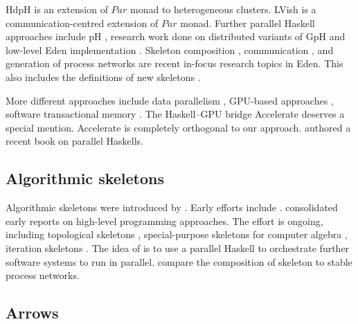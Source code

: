\documentclass{jfp1}
\newcommand{\Conid}[1]{\mathit{#1}}
\renewcommand{\cite}[1]{\citep{#1}}
\begin{document}
HdpH \cite{Maier:2014:HDS:2775050.2633363,stewart_maier_trinder_2016} is an extension of \ensuremath{\Conid{Par}} monad to heterogeneous clusters. LVish \cite{Kuper:2014:TPE:2666356.2594312} is a communication-centred extension of \ensuremath{\Conid{Par}} monad.
%
Further parallel Haskell approaches include pH \cite{ph-book}, research work done on distributed variants of GpH \cite{Trinder1996,Aljabri:2013:DIG:2620678.2620682,Aljabri2015} and low-level Eden implementation \cite{JostThesis,berthold_loidl_hammond_2016}. Skeleton composition \cite{dieterle_horstmeyer_loogen_berthold_2016}, communication \cite{Dieterle2010}, and generation of process networks \cite{Horstmeyer2013} are recent in-focus research topics in Eden. This also includes the definitions of new skeletons \cite{doi:10.1142/S0129626403001380,Eden:PARCO05,Berthold2009-mr,Berthold2009-fft,dieterle2010skeleton,delaEncina2011,Dieterle2013,janjic2013space}.

More different approaches include data parallelism \cite{Chakravarty2007,Keller:2010:RSP:1932681.1863582,}, GPU-based approaches \cite{Mainland:2010:NEC:2088456.1863533,obsidian-phd}, software transactional memory \cite{Harris:2005:CMT:1065944.1065952,Perfumo:2008:LST:1366230.1366241}.
%
The Haskell--GPU bridge Accelerate \cite{Chakravarty:2011:AHA:1926354.1926358,CMCK14,McDonell:2015:TRC:2887747.2804313} deserves a special mention. Accelerate is completely orthogonal to our approach. \citeauthor{marlow2013parallel} authored a recent book \citeyear{marlow2013parallel} on parallel Haskells.

\subsection{Algorithmic skeletons}

Algorithmic skeletons were introduced by \citet{Cole1989}.
Early efforts include \cite{darlington1993parallel,botorog1996efficient,p3l97,Gorlatch1998,Lengauer1997}. \citet{SkeletonBook} consolidated early reports on high-level programming approaches.
The effort is ongoing, including topological skeletons \cite{Eden:PARCO05}, special-purpose skeletons for computer algebra \cite{Berthold2009-fft,lobachev-phd,Lobachev2012,janjic2013space}, iteration skeletons \cite{Dieterle2013}. The idea of \citet{scscp} is to use a parallel Haskell to orchestrate further software systems to run in parallel. \citet{dieterle_horstmeyer_loogen_berthold_2016} compare the composition of skeleton to stable process networks.

\subsection{Arrows}
\end{document}
